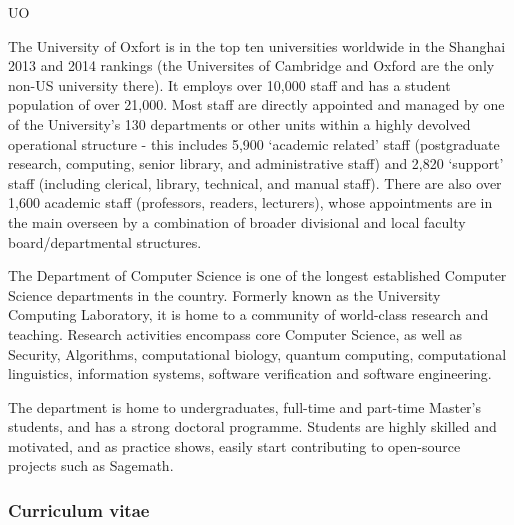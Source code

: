 \begin{sitedescription}{UO}



The University of Oxfort is in the top ten universities worldwide in the Shanghai 2013 and 2014
rankings (the Universites of Cambridge and Oxford are the only non-US university there).
It employs over 10,000 staff and has a student population of over 21,000.
Most staff are directly appointed and managed by one of the University’s 130 departments or
other units within a highly devolved operational structure - this includes 5,900 ‘academic related’
staff (postgraduate research, computing, senior library, and administrative staff) and
2,820 ‘support’ staff (including clerical, library, technical, and manual staff). There are also
over 1,600 academic staff (professors, readers, lecturers), whose appointments are in the
main overseen by a combination of broader divisional and local faculty board/departmental
structures. 

The Department of Computer Science is one of the longest established
Computer Science departments in the country. Formerly known as the
University Computing Laboratory, it is home to a community of world-class research and
teaching. Research activities encompass core Computer Science, as well as Security,
Algorithms, computational biology, quantum computing, computational linguistics,
information systems, software verification and software engineering. 

The department is home to undergraduates, full-time and part-time Master's
students, and has a strong doctoral programme.  Students are highly skilled and
motivated, and as practice shows, easily start contributing to open-source
projects such as Sagemath.

\subsubsection*{Curriculum vitae}






\end{sitedescription}
